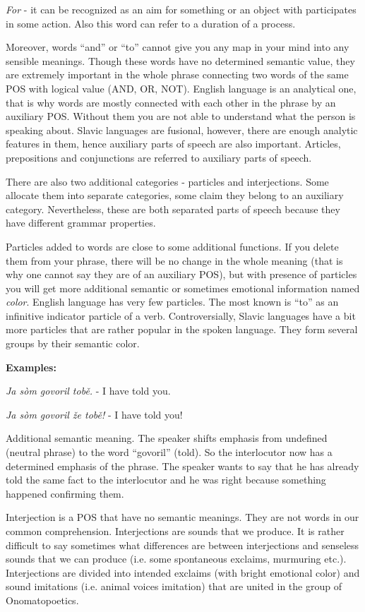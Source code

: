 \textit{For} - it can be recognized as an aim for something or an object with participates in some action. Also this word can refer to a duration of a process.

Moreover, words “and” or “to” cannot give you any map in your mind into any sensible meanings. Though these words have no determined semantic value, they are extremely important in the whole phrase connecting two words of the same POS with logical value (AND, OR, NOT). English language is an analytical one, that is why words are mostly connected with each other in the phrase by an auxiliary POS. Without them you are not able to understand what the person is speaking about. Slavic languages are fusional, however, there are enough analytic features in them, hence auxiliary parts of speech are also important. Articles, prepositions and conjunctions are referred to auxiliary parts of speech.

There are also two additional categories - particles and interjections. Some allocate them into separate categories, some claim they belong to an auxiliary category. Nevertheless, these are both separated parts of speech because they have different grammar properties.

Particles added to words are close to some additional functions. If you delete them from your phrase, there will be no change in the whole meaning (that is why one cannot say they are of an auxiliary POS), but with presence of particles you will get more additional semantic or sometimes emotional information named \textit{color}. English language has very few particles. The most known is “to” as an infinitive indicator particle of a verb. Controversially, Slavic languages have a bit more particles that are rather popular in the spoken language. They form several groups by their semantic color.

\textbf{Examples:}

\textit{Ja sòm govoril tobě.} - I have told you.

\textit{Ja sòm govoril že tobě!} - I have told you!

Additional semantic meaning. The speaker shifts emphasis from undefined (neutral phrase) to the word “govoril” (told). So the interlocutor now has a determined emphasis of the phrase. The speaker wants to say that he has already told the same fact to the interlocutor and he was right because something happened confirming them.

Interjection is a POS that have no semantic meanings. They are not words in our common comprehension. Interjections are sounds that we produce. It is rather difficult to say sometimes what differences are between interjections and senseless sounds that we can produce (i.e. some spontaneous exclaims, murmuring etc.). Interjections are divided into intended exclaims (with bright emotional color) and sound imitations (i.e. animal voices imitation) that are united in the group of Onomatopoetics.

